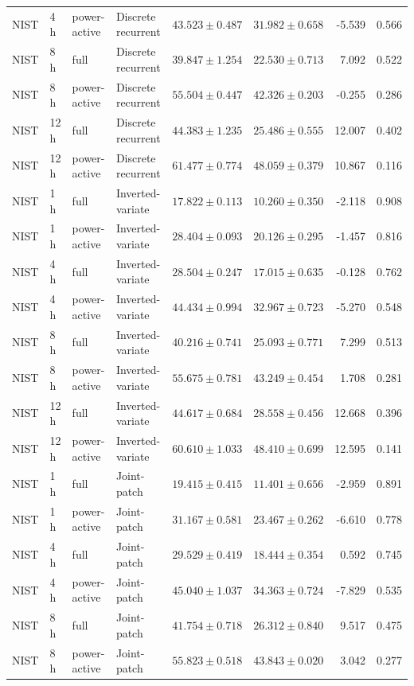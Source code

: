 \begin{longtable}{lll l rrrr}
NIST & 4 h & power-active & Discrete recurrent & $43.523\pm0.487$ & $31.982\pm0.658$ & -5.539 & 0.566\\
NIST & 8 h & full & Discrete recurrent & $39.847\pm1.254$ & $22.530\pm0.713$ & 7.092 & 0.522\\
NIST & 8 h & power-active & Discrete recurrent & $55.504\pm0.447$ & $42.326\pm0.203$ & -0.255 & 0.286\\
NIST & 12 h & full & Discrete recurrent & $44.383\pm1.235$ & $25.486\pm0.555$ & 12.007 & 0.402\\
NIST & 12 h & power-active & Discrete recurrent & $61.477\pm0.774$ & $48.059\pm0.379$ & 10.867 & 0.116\\
NIST & 1 h & full & Inverted-variate & $17.822\pm0.113$ & $10.260\pm0.350$ & -2.118 & 0.908\\
NIST & 1 h & power-active & Inverted-variate & $28.404\pm0.093$ & $20.126\pm0.295$ & -1.457 & 0.816\\
NIST & 4 h & full & Inverted-variate & $28.504\pm0.247$ & $17.015\pm0.635$ & -0.128 & 0.762\\
NIST & 4 h & power-active & Inverted-variate & $44.434\pm0.994$ & $32.967\pm0.723$ & -5.270 & 0.548\\
NIST & 8 h & full & Inverted-variate & $40.216\pm0.741$ & $25.093\pm0.771$ & 7.299 & 0.513\\
NIST & 8 h & power-active & Inverted-variate & $55.675\pm0.781$ & $43.249\pm0.454$ & 1.708 & 0.281\\
NIST & 12 h & full & Inverted-variate & $44.617\pm0.684$ & $28.558\pm0.456$ & 12.668 & 0.396\\
NIST & 12 h & power-active & Inverted-variate & $60.610\pm1.033$ & $48.410\pm0.699$ & 12.595 & 0.141\\
NIST & 1 h & full & Joint-patch & $19.415\pm0.415$ & $11.401\pm0.656$ & -2.959 & 0.891\\
NIST & 1 h & power-active & Joint-patch & $31.167\pm0.581$ & $23.467\pm0.262$ & -6.610 & 0.778\\
NIST & 4 h & full & Joint-patch & $29.529\pm0.419$ & $18.444\pm0.354$ & 0.592 & 0.745\\
NIST & 4 h & power-active & Joint-patch & $45.040\pm1.037$ & $34.363\pm0.724$ & -7.829 & 0.535\\
NIST & 8 h & full & Joint-patch & $41.754\pm0.718$ & $26.312\pm0.840$ & 9.517 & 0.475\\
NIST & 8 h & power-active & Joint-patch & $55.823\pm0.518$ & $43.843\pm0.020$ & 3.042 & 0.277\\

\end{longtable}
